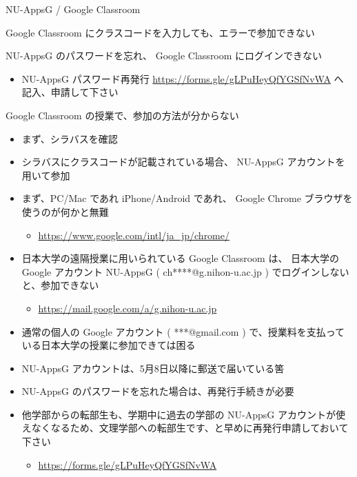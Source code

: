 \documentclass[a4j,10pt]{jsarticle}
\begin{document}
{\begin{frame}[label={sec:org25495ab},fragile]{NU-AppsG / Google Classroom}
\begin{block}{Google Classroom にクラスコードを入力しても、エラーで参加できない}
\begin{itemize}
\end{itemize}
\end{block}
\par
\begin{block}{NU-AppsG のパスワードを忘れ、 Google Classroom にログインできない}
\begin{itemize}
\item NU-AppsG パスワード再発行
\url{https://forms.gle/gLPuHeyQfYGSfNvWA}
へ記入、申請して下さい
\end{itemize}
\end{block}
\par
\begin{block}{Google Classroom の授業で、参加の方法が分からない}
\begin{itemize}
\item まず、シラバスを確認
\item シラバスにクラスコードが記載されている場合、 NU-AppsG アカウントを用いて参加
\par
\item まず、PC/Mac であれ iPhone/Android であれ、 Google Chrome ブラウザを使うのが何かと無難
\begin{itemize}
\item \url{https://www.google.com/intl/ja\_jp/chrome/}
\end{itemize}
\par
\item 日本大学の遠隔授業に用いられている Google Classroom は、
日本大学の Google アカウント NU-AppsG ( ch****@g.nihon-u.ac.jp ) でログインしないと、参加できない
\begin{itemize}
\item \url{https://mail.google.com/a/g.nihon-u.ac.jp}
\end{itemize}
\par
\item 通常の個人の Google アカウント ( ***@gmail.com ) で、授業料を支払っている日本大学の授業に参加できては困る
\item NU-AppsG アカウントは、5月8日以降に郵送で届いている筈
\par
\item NU-AppsG のパスワードを忘れた場合は、再発行手続きが必要
\item 他学部からの転部生も、学期中に過去の学部の NU-AppsG アカウントが使えなくなるため、文理学部への転部生です、と早めに再発行申請しておいて下さい
\begin{itemize}
\item \url{https://forms.gle/gLPuHeyQfYGSfNvWA}
\end{itemize}

\end{itemize}
\end{block}
\end{frame}}
\end{document}
